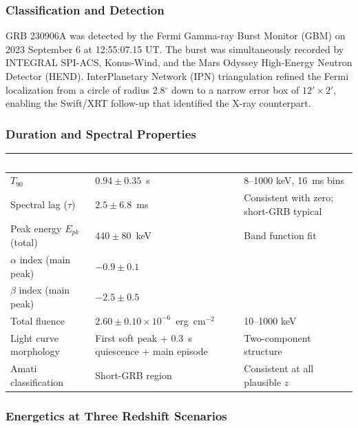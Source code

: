 \documentclass[11pt,letterpaper]{article}
\newcommand{\tableheader}[1]{\textbf{\sffamily\textcolor{white}{#1}}}
\begin{document}
\subsubsection{Classification and Detection}

GRB 230906A was detected by the Fermi Gamma-ray Burst Monitor (GBM) on 2023 September 6 at 12:55:07.15 UT. The burst was simultaneously recorded by INTEGRAL SPI-ACS, Konus-Wind, and the Mars Odyssey High-Energy Neutron Detector (HEND). InterPlanetary Network (IPN) triangulation refined the Fermi localization from a circle of radius 2.8$^\circ$ down to a narrow error box of $12' \times 2'$, enabling the Swift/XRT follow-up that identified the X-ray counterpart.

\subsubsection{Duration and Spectral Properties}

\begin{center}
\begin{tabularx}{\textwidth}{L{3.5cm}XL{3.5cm}}
\toprule
{}
\tableheader{Parameter} & \tableheader{Value} & \tableheader{Notes} \\
\midrule
$T_{90}$ & $0.94 \pm 0.35$~s & 8--1000 keV, 16~ms bins \\
Spectral lag ($\tau$) & $2.5 \pm 6.8$~ms & Consistent with zero; short-GRB typical \\
Peak energy $E_{pk}$ (total) & $440 \pm 80$~keV & Band function fit \\
$\alpha$ index (main peak) & $-0.9 \pm 0.1$ & \\
$\beta$ index (main peak) & $-2.5 \pm 0.5$ & \\
Total fluence & $2.60 \pm 0.10 \times 10^{-6}$~erg~cm$^{-2}$ & 10--1000 keV \\
Light curve morphology & First soft peak + 0.3~s quiescence + main episode & Two-component structure \\
Amati classification & Short-GRB region & Consistent at all plausible $z$ \\
\bottomrule
\end{tabularx}
\end{center}

\subsubsection{Energetics at Three Redshift Scenarios}
\end{document}
